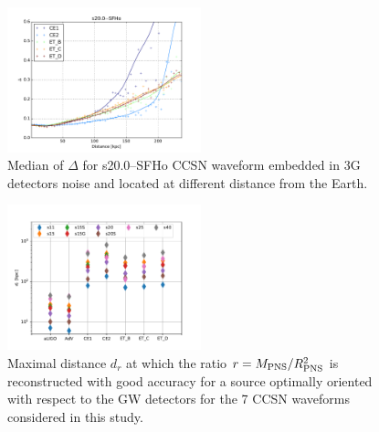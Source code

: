 \\

\begin{figure}
  \centering
  \includegraphics[width=0.5\textwidth]{plots/s20--SFHo_all3G}
  \caption{Median of $\Delta$ for s20.0--SFHo CCSN waveform embedded in 3G detectors noise and located at different distance from the Earth. } \label{fig:s20--SFHo_all3G}
\end{figure}

\begin{figure}
  \centering
  \includegraphics[width=0.5\textwidth]{plots/dist_allwvfs_2G3G}
  \caption{Maximal distance $d_{r}$ at which the ratio $r=M_{\rm PNS}/R_{\rm PNS}^2$ is reconstructed
    with good accuracy for a source optimally oriented with respect to the GW detectors for the 7 CCSN waveforms considered in this study.} \label{fig:distances}
\end{figure}



